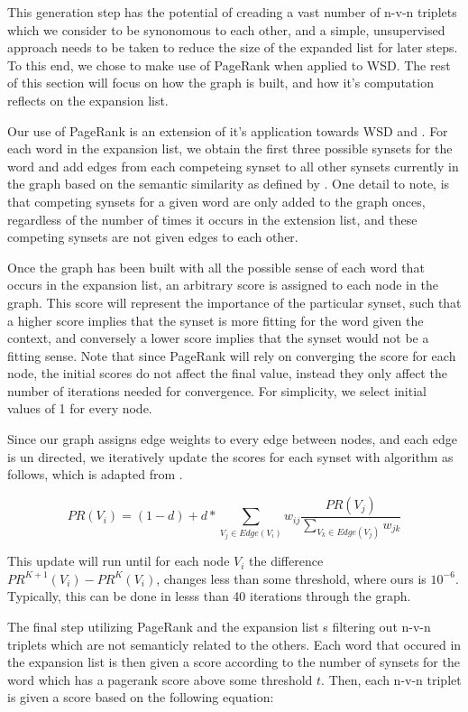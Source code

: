 \documentclass[11pt]{article}
\begin{document}
This generation step has the potential of creading a vast number of n-v-n
triplets which we consider to be synonomous to each other, and a simple,
unsupervised approach needs to be taken to reduce the size of the expanded list
for later steps.  To this end, we chose to make use of PageRank when applied to
WSD.  The rest of this section will focus on how the graph is built, and how
it's computation reflects on the expansion list.

Our use of PageRank is an extension of it's application towards WSD
\cite{mihalcea04pagerankwsd} and \cite{mihalcea06randomwalks}.  For each word in
the expansion list, we obtain the first three possible synsets for the word and
add edges from each competeing synset to all other synsets currently in the
graph based on the semantic similarity as defined by
\cite{banerjee03extendedgloss}.  One detail to note, is that competing synsets
for a given word are only added to the graph onces, regardless of the number of
times it occurs in the extension list, and these competing synsets are not
given edges to each other. 

Once the graph has been built with all the possible sense of each word that
occurs in the expansion list, an arbitrary score is assigned to each node in the
graph.  This score will represent the importance of the particular synset, such
that a higher score implies that the synset is more fitting for the word given
the context, and conversely a lower score implies that the synset would not be a
fitting sense.  Note that since PageRank will rely on converging the score for
each node, the initial scores do not affect the final value, instead they only
affect the number of iterations needed for convergence.  For simplicity, we
select initial values of 1 for every node.  

Since our graph assigns edge weights to every edge between 
nodes, and each edge is un directed, we iteratively update the scores for each
synset with algorithm as follows, which is adapted from \cite{mihalcea06randomwalks}.   

\[  PR(V_i) = (1-d) + d*\sum_{V_j \in Edge(V_i)} w_{ij} \frac{PR(V_j)}
   {\displaystyle\sum_{V_k \in Edge(V_j)} w_{jk}}
   \]

This update will run until for each node \(V_i\) the difference \(PR^{K+1}(V_i)
- PR^{K}(V_i)\), changes less than some threshold, where ours is \(10^{-6}\).
Typically, this can be done in lesss than 40 iterations through the graph.

The final step utilizing PageRank and the expansion list s filtering out n-v-n
triplets which are not semanticly related to the others.  Each word that occured
in the expansion list is then given a score according to the number of synsets
for the word which has a pagerank score above some threshold \(t\).  Then, each
  n-v-n triplet is given a score based on the following equation:
\end{document}
